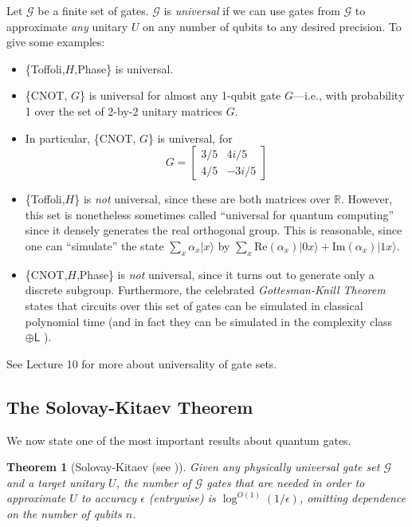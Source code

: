 \documentclass[12pt]{report}
\theoremstyle{plain}
\newtheorem{theorem}{Theorem}[section]
\theoremstyle{definition}
\newcommand{\R}{{\mathbb R}}
\renewcommand{\ket}[1]{|#1\rangle}
\begin{document}
Let $\mathcal{G}$ be a finite set of gates.
$\mathcal{G}$ is {\em universal} if we can use gates from $\mathcal{G}$ to
approximate {\em any} unitary $U$ on any number of qubits to any
desired precision.  To give some examples:

\begin{itemize}
\item \{Toffoli,$H$,Phase\} is universal.
\item \{CNOT, $G$\} is universal for almost any 1-qubit gate $G$---i.e., with
probability 1 over the set of 2-by-2 unitary matrices $G$.
\item In particular, \{CNOT, $G$\} is universal, for
$$G =
\left[
\begin{array}{cc}
3/5 & 4i/5 \\
4/5 & -3i/5
\end{array}
\right]
$$
\item \{Toffoli,$H$\} is {\em not} universal, since these are both matrices
over $\R$.  However, this set is nonetheless sometimes called
``universal for quantum computing'' since it densely generates the real
orthogonal group.  This is reasonable, since one can ``simulate''
the state
$\sum_x \alpha_x \ket{x}$ by
$\sum_x \mathrm{Re}(\alpha_x)\ket{0x} + \mathrm{Im}(\alpha_x)\ket{1x}$.

\item \{CNOT,$H$,Phase\} is {\em not} universal, since it turns out to generate only a
discrete subgroup.  Furthermore, the celebrated \emph{Gottesman-Knill Theorem} states
that circuits over this set of gates can be simulated in classical polynomial time
(and in fact they can be simulated in the complexity class $\mathsf{\oplus L}$ \cite{ag}).
\end{itemize}

See Lecture 10 for more about universality of gate sets.

\subsection{The Solovay-Kitaev Theorem}

We now state one of the most important results about quantum gates.

\begin{theorem}[Solovay-Kitaev (see \cite{solovaykitaev})]
Given any physically universal gate set $\mathcal{G}$ and a target unitary $U$, the
number of $\mathcal{G}$ gates that are needed in order to approximate $U$ to
accuracy $\epsilon$ (entrywise) is $\log^{O(1)}(1/\epsilon)$, omitting dependence on the
number of qubits $n$.
\end{theorem}
\end{document}
